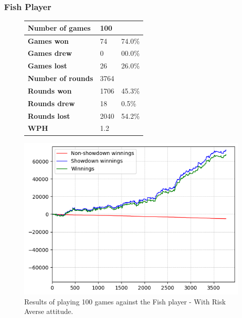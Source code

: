 \subsubsection{Fish Player}
\begin{figure}[H]
    \centering
    \begin{minipage}{\textwidth}
        \begin{minipage}{0.40\textwidth}
            \begin{tabular}{|l|l|l|}
                \hline
                \textbf{Number of games}  & 100   &        \\ \hline
                \textbf{Games won}        & 74    & 74.0\% \\ \hline
                \textbf{Games drew}       & 0     & 00.0\%  \\ \hline
                \textbf{Games lost}       & 26    & 26.0\% \\ \hline
                \textbf{Number of rounds} & 3764  &        \\ \hline
                \textbf{Rounds won}       & 1706   & 45.3\%  \\ \hline
                \textbf{Rounds drew}      & 18     & 0.5\%  \\ \hline
                \textbf{Rounds lost}      & 2040  & 54.2\% \\ \hline
                \textbf{WPH}              & 1.2 &        \\ \hline
            \end{tabular}
        \end{minipage}
        \hspace{0.05\textwidth}
        \begin{minipage}{0.5\textwidth}
            \includegraphics[width=\textwidth]{graphics/risk-averse/fish.png}
        \end{minipage}
    \end{minipage}
    \caption{Results of playing 100 games against the Fish player - With Risk Averse attitude.}
    \label{fig:results_averse_fish}
\end{figure}

